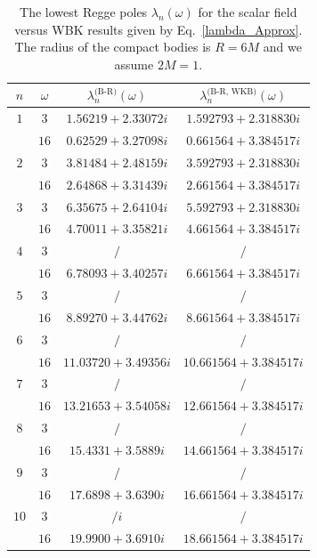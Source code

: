 \documentclass[aps,prd,longbibliography,reprint,twocolumn,amsmath,amssymb,amsfonts,showpacs,superscriptaddress]{revtex4-1}%
\begin{document}
\begingroup
\squeezetable
\begin{table}[htp]
\caption{\label{tab:table3} The lowest Regge poles $\lambda_{n}(\omega)$ for the scalar field versus WBK results given by Eq.~\eqref{lambda_Approx}. The radius of the compact bodies is $R = 6M$ and we assume $2M=1$.}
\smallskip
\centering
\begin{ruledtabular}
\begin{tabular}{cccc}
 $n$ & $\omega$  & $\lambda^{\text{(B-R)}}_n(\omega)$ & $\lambda^{\text{(B-R, WKB)}}_n(\omega)$
 \\ \hline
$1$  & $3$  & $1.56219+2.33072 i$  & $1.592793+2.318830i$   \\
     & $16$ & $ 0.62529+3.27098 i$ & $0.661564+3.384517i $   \\

$2$  & $3$  & $3.81484+2.48159 i$  & $3.592793+2.318830i $    \\
     & $16$ & $2.64868+3.31439 i$  & $2.661564+3.384517i $    \\

$3$  & $3$  & $6.35675+2.64104 i$ & $5.592793+2.318830i $    \\
     & $16$ & $4.70011+3.35821 i$  & $4.661564+3.384517i $    \\

$4$  & $3$  & $/$  & $ / $   \\
     & $16$ & $6.78093+3.40257 i$  & $6.661564+3.384517i $  \\

$5$  & $3$  & $/$  & $/$     \\
     & $16$ & $8.89270+3.44762 i$  & $8.661564+3.384517i $   \\

$6$  & $3$  & $/$  & $/$    \\
     & $16$ & $11.03720+3.49356 i$ & $10.661564+3.384517i $ \\

$7$  & $3$  & $/$ & $/$     \\
     & $16$ & $13.21653+3.54058 i$  & $12.661564+3.384517i$ \\

$8$  & $3$ & $/$   & $/$     \\
     & $16$ & $15.4331+3.5889 i$  & $14.661564+3.384517i $  \\

$9$  & $3$ & $/$   & $/$   \\
     & $16$ & $17.6898+3.6390 i$  & $16.661564+3.384517i $   \\

$10$  & $3$  & $/i$  & $/$   \\
     & $16$  & $19.9900+3.6910 i$  & $18.661564+3.384517i $  \\
\end{tabular}
\end{ruledtabular}
\end{table}
\endgroup
\end{document}
